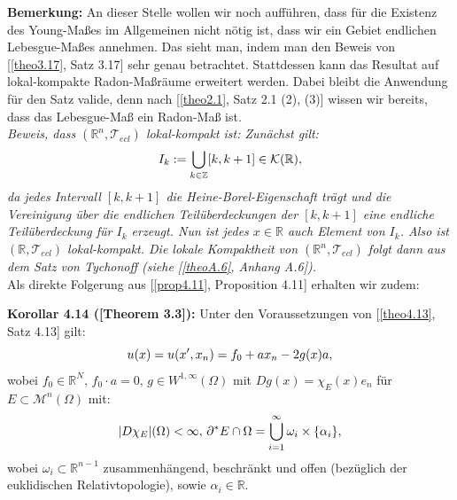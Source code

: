 \textbf{Bemerkung:} An dieser Stelle wollen wir noch aufführen, dass für die Existenz des Young-Maßes im Allgemeinen nicht nötig ist, dass wir ein Gebiet endlichen Lebesgue-Maßes annehmen. Das sieht man, indem man den Beweis von [\ref{theo3.17}, Satz 3.17] sehr genau betrachtet. Stattdessen kann das Resultat auf lokal-kompakte Radon-Maßräume erweitert werden. Dabei bleibt die Anwendung für den Satz valide, denn nach [\ref{theo2.1}, Satz 2.1 (2), (3)] wissen wir bereits, dass das Lebesgue-Maß ein Radon-Maß ist.\\
\textit{Beweis, dass \((\mathbb{R}^n,\mathcal{T}_{ecl})\) lokal-kompakt ist: Zunächst gilt:
\begin{equation}{\label{eq4.77}}
    I_k := \bigcup_{k \in \mathbb{Z}} [k,k+1] \in \mathcal{K}(\mathbb{R}),
\end{equation}
da jedes Intervall \([k,k+1]\) die Heine-Borel-Eigenschaft trägt und die Vereinigung über die endlichen Teilüberdeckungen der \([k,k+1]\) eine endliche Teilüberdeckung für \(I_k\) erzeugt. Nun ist jedes \(x \in \mathbb{R}\) auch Element von \(I_k\). Also ist \((\mathbb{R},\mathcal{T}_{ecl})\) lokal-kompakt. Die lokale Kompaktheit von \((\mathbb{R}^n,\mathcal{T}_{ecl})\) folgt dann aus dem Satz von Tychonoff (siehe [\ref{theoA.6}, Anhang A.6]). \QEDB}\\
Als direkte Folgerung aus [\ref{prop4.11}, Proposition 4.11] erhalten wir zudem:\\[0.5cm]
\colorbox{generalYellow}{\begin{minipage}{16cm}{\textcolor{black}{}{\label{kor4.14}}}
\textbf{Korollar 4.14 (\cite{ContiTwoGradientPhase}[Theorem 3.3]):} Unter den Voraussetzungen von [\ref{theo4.13}, Satz 4.13] gilt:
\begin{equation}{\label{eq4.78}}
    u(x) = u(x',x_n) = f_0 + ax_n - 2g(x)a,
\end{equation}
wobei \(f_0 \in \mathbb{R}^N, \, f_0 \cdot a = 0, \, g \in W^{1,\infty}(\Omega)\) mit \(Dg(x) = \chi_E(x)e_n\) für \(E \subset \mathcal{M}^n(\Omega)\) mit:
\begin{equation}{\label{eq4.79}}
    |D\chi_E|(\Omega) < \infty, \, \partial^* E \cap \Omega = \bigcup_{i=1}^{\infty} \omega_i \times \{\alpha_i\},
\end{equation}
wobei \(\omega_i \subset \mathbb{R}^{n-1}\) zusammenhängend, beschränkt und offen (bezüglich der euklidischen Relativtopologie), sowie \(\alpha_i \in \mathbb{R}\).
\end{minipage}}

